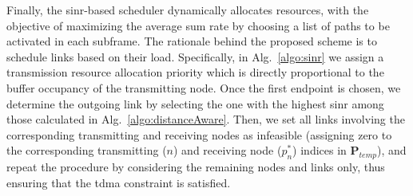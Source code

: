 Finally, the \gls{sinr}-based scheduler dynamically allocates resources, with the objective of maximizing the average sum rate %
by choosing a list of paths to be activated in each subframe. The rationale behind the proposed scheme is to schedule links based on their load. Specifically, in Alg.~\ref{algo:sinr} we assign a transmission resource allocation priority which is directly proportional to the buffer occupancy of the transmitting node. Once the first endpoint is chosen, we determine the outgoing link by selecting the one with the highest \gls{sinr} among those calculated in Alg.~\ref{algo:distanceAware}. Then, we set all links involving the corresponding transmitting and receiving nodes as infeasible (assigning zero to the corresponding transmitting ($n$) and receiving node ($p_n^{*}$) indices in $\bm{P}_{temp}$), and repeat the procedure by considering the remaining nodes and links only, thus ensuring that the \gls{tdma} constraint is satisfied. 

